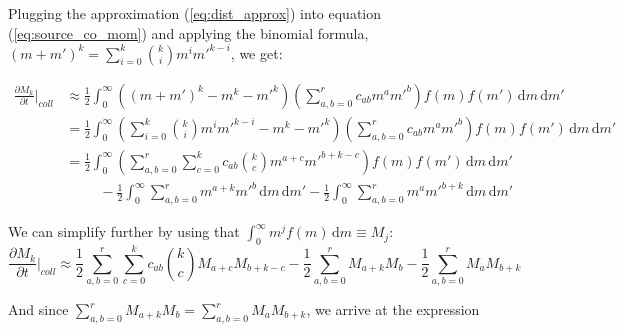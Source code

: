 \documentclass{report}
\begin{document}
Plugging the approximation (\ref{eq:dist_approx}) into equation (\ref{eq:source_co_mom}) and applying the binomial formula, $(m+m')^k = \sum_{i=0}^k {k \choose i} m^i m'^{k-i}$, we get:

\begin{equation}
\begin{aligned}
    \frac{\partial M_k}{\partial t} \biggr\rvert_{coll} &\approx \frac{1}{2}\int_0^\infty \left((m+m')^k - m^k - {m'}^k\right) \left(\sum_{a,b=0}^{r} c_{ab} m^a{m'}^b\right)f(m)f(m') \, \text{d}m\, \text{d}m' \\
    &= \frac{1}{2}\int_0^\infty \left(\sum_{i=0}^k {k \choose i} m^i m'^{k-i} - m^k - {m'}^k\right) \left(\sum_{a,b=0}^{r} c_{ab} m^a{m'}^b\right)f(m)f(m') \, \text{d}m\, \text{d}m' \\
    &= \frac{1}{2}\int_0^\infty \left(\sum_{a,b=0}^{r}\sum_{c=0}^{k} c_{ab} {k \choose c} m^{a+c}m'^{b+k-c} \right) f(m) f(m')\, \text{d}m\, \text{d}m' \\ &~~~~~~~~~~~- \frac{1}{2}\int_0^\infty \sum_{a,b=0}^{r} m^{a+k} m'^b\, \text{d}m\, \text{d}m' - \frac{1}{2}\int_0^\infty \sum_{a,b=0}^{r} m^{a} m'^{b+k}\, \text{d}m\, \text{d}m'
\label{eq:derivation_source_co_mom_approx}
\end{aligned}
\end{equation}

\noindent We can simplify further by using that $\int_0^\infty m^j f(m)\, \text{d}m \equiv M_j$:
\begin{equation}
    \frac{\partial M_k}{\partial t} \biggr\rvert_{coll} \approx
    \frac{1}{2}\sum_{a,b=0}^{r}\sum_{c=0}^{k} c_{ab} {k \choose c} M_{a+c}M_{b+k-c} - \frac{1}{2} \sum_{a,b=0}^{r} M_{a+k} M_b - \frac{1}{2}\sum_{a,b=0}^{r} M_{a} M_{b+k}
\label{eq:derivation_source_co_mom_approx_contd}
\end{equation}

\noindent And since $\sum_{a,b=0}^{r} M_{a+k} M_b = \sum_{a,b=0}^{r} M_{a} M_{b+k}$, we arrive at the expression 
\end{document}
